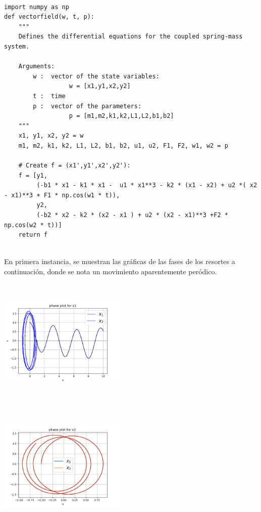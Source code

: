 \documentclass{article}
\begin{document}
\begin{verbatim}

import numpy as np
def vectorfield(w, t, p):
    """
    Defines the differential equations for the coupled spring-mass system.

    Arguments:
        w :  vector of the state variables:
                  w = [x1,y1,x2,y2]
        t :  time
        p :  vector of the parameters:
                  p = [m1,m2,k1,k2,L1,L2,b1,b2]
    """
    x1, y1, x2, y2 = w
    m1, m2, k1, k2, L1, L2, b1, b2, u1, u2, F1, F2, w1, w2 = p

    # Create f = (x1',y1',x2',y2'):
    f = [y1,
         (-b1 * x1 - k1 * x1 -  u1 * x1**3 - k2 * (x1 - x2) + u2 *( x2 - x1)**3 + F1 * np.cos(w1 * t)), 
         y2,
         (-b2 * x2 - k2 * (x2 - x1 ) + u2 * (x2 - x1)**3 +F2 * np.cos(w2 * t))]
    return f
    
\end{verbatim}

En primera instancia, se muestran las gráficas de las fases de los resortes a continuación, donde se nota un movimiento aparentemente peródico.
\begin{center}
  \includegraphics[width=6cm, height=6cm]{ej3_11.png}
\end{center}

\begin{center}
  \includegraphics[width=6cm, height=6cm]{ej3_12.png}
\end{center}
\end{document}
